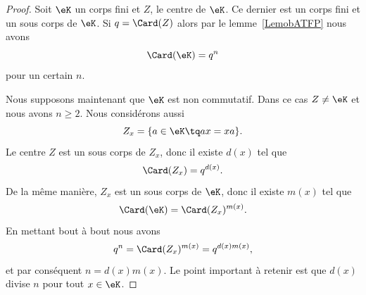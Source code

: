 \begin{proof}
    Soit \( \eK\) un corps fini et \( Z\), le centre de \( \eK\). Ce dernier est un corps fini et un sous corps de \( \eK\). Si \( q=\Card(Z)\) alors par le lemme~\ref{LemobATFP} nous avons
    \begin{equation}
        \Card(\eK)=q^n
    \end{equation}
    pour un certain \( n\).

    Nous supposons maintenant que \( \eK\) est non commutatif. Dans ce cas \( Z\neq \eK\) et nous avons \( n\geq 2\). Nous considérons aussi
    \begin{equation}
        Z_x=\{ a\in \eK\tq ax=xa \}.
    \end{equation}
    Le centre \( Z\) est un sous corps de \( Z_x\), donc il existe \( d(x)\) tel  que
    \begin{equation}
        \Card(Z_x)=q^{d(x)}.
    \end{equation}
    De la même manière, \( Z_x\) est un sous corps de \( \eK\), donc il existe \( m(x)\) tel que
    \begin{equation}
        \Card(\eK)=\Card(Z_x)^{m(x)}.
    \end{equation}
    En mettant bout à bout nous avons
    \begin{equation}
        q^n=\Card(Z_x)^{m(x)}=q^{d(x)m(x)},
    \end{equation}
    et par conséquent \( n=d(x)m(x)\). Le point important à retenir est que \( d(x)\) divise \( n\) pour tout \( x\in \eK\).


\end{proof}
